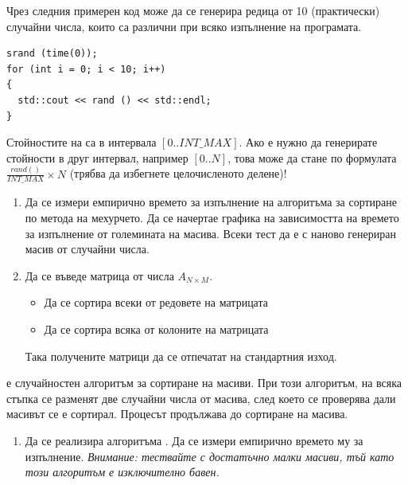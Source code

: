 {\begin{mdframed}[hidealllines=true,backgroundcolor=gray!20]
Чрез следния примерен код може да се генерира редица от 10 (практически) случайни числа, които са различни при всяко изпълнение на програмата.
\begin{verbatim}
srand (time(0));
for (int i = 0; i < 10; i++)
{
  std::cout << rand () << std::endl;
}
\end{verbatim}
Стойностите на  са в интервала $[0..INT\_MAX]$. Ако е нужно да генерирате стойности в друг интервал, например $[0..N]$, това може да стане по формулата $\frac{rand()}{INT\_MAX}\times N$ (трябва да избегнете целочисленото делене)!
\end{mdframed}

\begin{enumerate}[resume]

  \item Да се измери емпирично времето за изпълнение на алгоритъма за сортиране по метода на мехурчето. Да се начертае графика на зависимостта на времето за изпълнение от големината на масива. Всеки тест да е с наново генериран масив от случайни числа.
  \item Да се въведе матрица от числа $A_{N \times M}$.
  \begin{itemize}
      \item Да се сортира всеки от редовете на матрицата
      \item Да се сортира всяка от колоните на матрицата
  \end{itemize}
  Така получените матрици да се отпечатат на стандартния изход.

\end{enumerate}



\begin{mdframed}[hidealllines=true,backgroundcolor=gray!20]
 е случайностен алгоритъм за сортиране на масиви. При този алгоритъм, на всяка стъпка се разменят две случайни числа от масива, след което се проверява дали масивът се е сортирал. Процесът продължава до сортиране на масива.
\end{mdframed}

\begin{enumerate}[resume]

  \item Да се реализира алгоритъма . Да се измери емпирично времето му за изпълнение. \emph{Внимание: тествайте с достатъчно малки масиви, тъй като този алгоритъм е изключително бавен.}

\end{enumerate}

}
